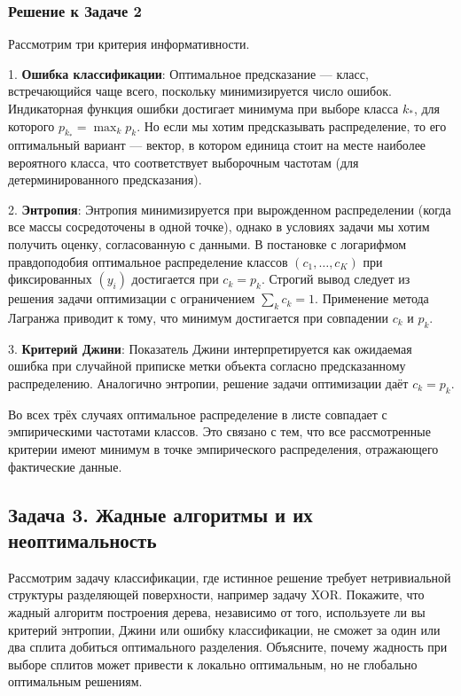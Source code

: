 \begin{itemize}
\subsubsection*{Решение к Задаче 2}

Рассмотрим три критерия информативности.

1. \textbf{Ошибка классификации}: 
Оптимальное предсказание — класс, встречающийся чаще всего, поскольку минимизируется число ошибок. Индикаторная функция ошибки достигает минимума при выборе класса \(k_*\), для которого \(p_{k_*} = \max_k p_k\). Но если мы хотим предсказывать распределение, то его оптимальный вариант — вектор, в котором единица стоит на месте наиболее вероятного класса, что соответствует выборочным частотам (для детерминированного предсказания).

2. \textbf{Энтропия}:
Энтропия минимизируется при вырожденном распределении (когда все массы сосредоточены в одной точке), однако в условиях задачи мы хотим получить оценку, согласованную с данными. В постановке с логарифмом правдоподобия оптимальное распределение классов \((c_1,\ldots,c_K)\) при фиксированных \((y_i)\) достигается при \(c_k = p_k\). Строгий вывод следует из решения задачи оптимизации с ограничением \(\sum_k c_k = 1\). Применение метода Лагранжа приводит к тому, что минимум достигается при совпадении \(c_k\) и \(p_k\).

3. \textbf{Критерий Джини}:
Показатель Джини интерпретируется как ожидаемая ошибка при случайной приписке метки объекта согласно предсказанному распределению. Аналогично энтропии, решение задачи оптимизации даёт \(c_k = p_k\).

Во всех трёх случаях оптимальное распределение в листе совпадает с эмпирическими частотами классов. Это связано с тем, что все рассмотренные критерии имеют минимум в точке эмпирического распределения, отражающего фактические данные.


\subsection*{Задача 3. Жадные алгоритмы и их неоптимальность}

Рассмотрим задачу классификации, где истинное решение требует нетривиальной структуры разделяющей поверхности, например задачу XOR. Покажите, что жадный алгоритм построения дерева, независимо от того, используете ли вы критерий энтропии, Джини или ошибку классификации, не сможет за один или два сплита добиться оптимального разделения. Объясните, почему жадность при выборе сплитов может привести к локально оптимальным, но не глобально оптимальным решениям.


\end{itemize}
